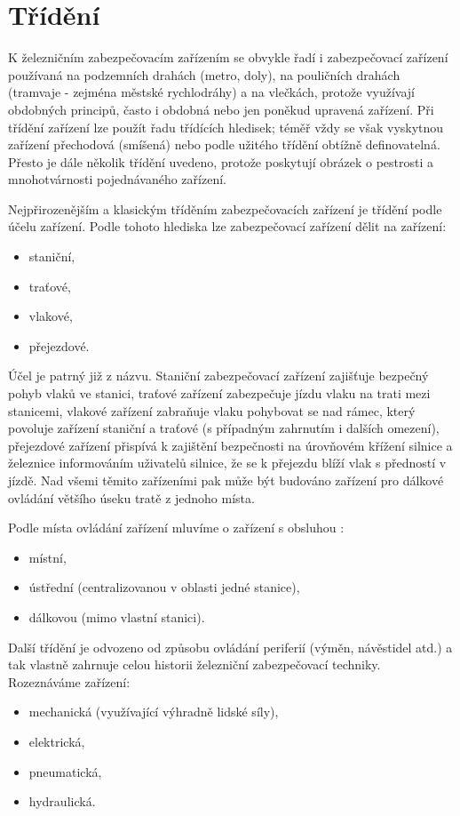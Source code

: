 \section{Třídění}
  K železničním zabezpečovacím zařízením se obvykle řadí i zabezpečovací zařízení používaná na
  podzemních drahách (metro, doly), na pouličních drahách (tramvaje - zejména městské rychlodráhy) 
  a na vlečkách, protože využívají obdobných principů, často i obdobná nebo jen poněkud upravená 
  zařízení. Při třídění zařízení lze použít řadu třídících hledisek; téměř vždy se však vyskytnou 
  zařízení přechodová (smíšená) nebo podle užitého třídění obtížně definovatelná. Přesto je dále 
  několik třídění uvedeno, protože poskytují obrázek o pestrosti a mnohotvárnosti pojednávaného 
  zařízení. 
  
  Nejpřirozenějším a klasickým tříděním zabezpečovacích zařízení je třídění podle účelu zařízení.
  Podle tohoto hlediska lze zabezpečovací zařízení dělit na zařízení: 
  \begin{itemize}
    \item staniční,
    \item traťové,
    \item vlakové,
    \item přejezdové. 
  \end{itemize}
  Účel je patrný již z názvu. Staniční zabezpečovací zařízení zajišťuje bezpečný pohyb vlaků ve 
  stanici, traťové zařízení zabezpečuje jízdu vlaku na trati mezi stanicemi, vlakové zařízení 
  zabraňuje vlaku pohybovat se nad rámec, který povoluje zařízení staniční a traťové (s případným 
  zahrnutím i dalších omezení), přejezdové zařízení přispívá k zajištění bezpečnosti na úrovňovém 
  křížení silnice a železnice informováním uživatelů silnice, že se k přejezdu blíží vlak s 
  předností v jízdě. Nad všemi těmito zařízeními pak může být budováno zařízení pro dálkové 
  ovládání většího úseku tratě z jednoho místa. 
  
  Podle místa ovládání zařízení mluvíme o zařízení s obsluhou :
    \begin{itemize}
    \item místní,
    \item ústřední (centralizovanou v oblasti jedné stanice),
    \item dálkovou (mimo vlastní stanici).
  \end{itemize}

  Další třídění je odvozeno od způsobu ovládání periferií (výměn, návěstidel atd.) a tak vlastně
  zahrnuje celou historii železniční zabezpečovací techniky. Rozeznáváme zařízení:
  \begin{itemize}
    \item mechanická (využívající výhradně lidské síly),
    \item elektrická,
    \item pneumatická,
    \item hydraulická. 
  \end{itemize}

